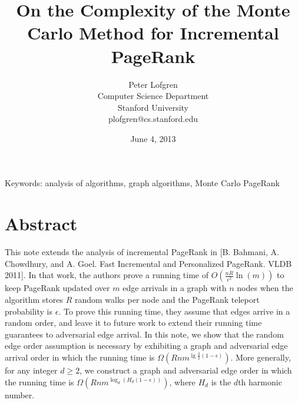 \documentclass{article}
\newcommand{\pn}[1]{\left( #1 \right)}
\begin{document}
\title{On the Complexity of the Monte Carlo Method for Incremental PageRank}
\author{Peter Lofgren\\
  Computer Science Department \\
  Stanford University\\
  plofgren@cs.stanford.edu}


\date{June 4, 2013}
\maketitle

Keywords: analysis of algorithms, graph algorithms, Monte Carlo PageRank

\section{Abstract}
This note extends the analysis of incremental PageRank in [B. Bahmani, A. Chowdhury, and A. Goel. Fast Incremental and Personalized PageRank.  VLDB 2011].  In that work, the authors prove a running time of $O(\frac{nR}{\epsilon^2} \ln(m))$ to keep PageRank updated over $m$ edge arrivals in a graph with $n$ nodes when the algorithm stores $R$ random walks per node and the PageRank teleport probability is $\epsilon$.  To prove this running time, they assume that edges arrive in a random order, and leave it to future work to extend their running time guarantees to adversarial edge arrival.  In this note, we show that the random edge order assumption is necessary by exhibiting a graph and adversarial edge arrival order in which the running time is $\Omega \pn{R n m^{\lg{\frac{3}{2}(1-\epsilon)}}}$.  More generally, for any integer $d \geq 2$, we construct a graph and adversarial edge order in which the running time is $\Omega \pn{R n m^{\log_d(H_d (1-\epsilon))}}$, where $H_d$ is the $d$th harmonic number.
\end{document}
